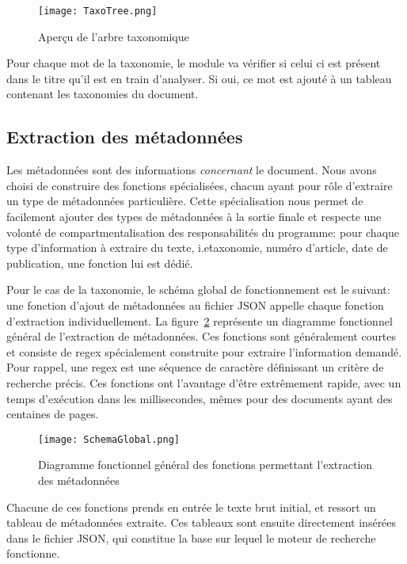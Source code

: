 \begin{figure}[h!]
  \centering
  \texttt{[image: TaxoTree.png]}
	\caption[]{Aperçu de l'arbre taxonomique}
  \label{fig:tree}
\end{figure}

Pour chaque mot de la taxonomie, le module va vérifier si celui ci est présent dans le titre qu'il est en train d'analyser.
Si oui, ce mot est ajouté à un tableau contenant les taxonomies du document.

\subsection{Extraction des métadonnées}
Les métadonnées sont des informations \textit{concernant} le document.
Nous avons choisi de construire des fonctions spécialisées, chacun ayant pour rôle d'extraire un type de métadonnées particulière.
Cette spécialisation nous permet de facilement ajouter des types de métadonnées à la sortie finale et respecte une volonté de compartmentalisation des responsabilités du programme: pour chaque type d'information à extraire du texte, i.e\. taxonomie, numéro d'article, date de publication, une fonction lui est dédié. 

Pour le cas de la taxonomie, le schéma global de fonctionnement est le suivant: une fonction d'ajout de métadonnées au fichier JSON appelle chaque fonction d'extraction individuellement.
La figure~\ref{fig:globalMeta} représente un diagramme fonctionnel général de l'extraction de métadonnées. 
Ces fonctions sont généralement courtes et consiste de regex spécialement construite pour extraire l'information demandé.
Pour rappel, une regex est une séquence de caractère définissant un critère de recherche précis.
Ces fonctions ont l'avantage d'être extrêmement rapide, avec un temps d'exécution dans les millisecondes, mêmes pour des documents ayant des centaines de pages. 

\begin{figure}[h!]
  \centering
	\texttt{[image: SchemaGlobal.png]}
	\caption[]{Diagramme fonctionnel général des fonctions permettant l'extraction des métadonnées}
  \label{fig:globalMeta}
\end{figure}

Chacune de ces fonctions prends en entrée le texte brut initial, et ressort un tableau de métadonnées extraite.
Ces tableaux sont ensuite directement insérées dans le fichier JSON, qui constitue la base sur lequel le moteur de recherche fonctionne.

